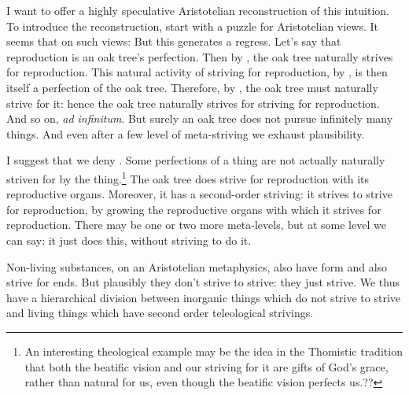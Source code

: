 I want to offer a highly speculative Aristotelian reconstruction of this intuition. To introduce the reconstruction, start with a puzzle for
Aristotelian views. It seems that on such views:
But this generates a regress. Let's say that reproduction is an oak tree's perfection. Then by , the oak tree naturally strives for
reproduction. This natural activity of striving for reproduction, by , is then itself a perfection of the oak tree. Therefore,
by , the oak tree must naturally strive for it: hence the oak tree naturally strives for striving for reproduction. And so on,
\textit{ad infinitum}. But surely an oak tree does not pursue infinitely many things. And even after a few level of meta-striving we exhaust plausibility.

I suggest that we deny . Some perfections of a thing are not actually naturally striven for by the thing.\footnote{An interesting
theological example may be the idea in the Thomistic tradition that both the beatific vision and our striving for it are gifts of God's grace, rather than
natural for us, even though the beatific vision perfects us.??} The oak tree does strive for reproduction with its reproductive organs. Moreover, it has a
second-order striving: it strives to strive for reproduction, by growing the reproductive organs with which it strives for reproduction. There may be one or
two more meta-levels, but at some level we can say: it just does this, without striving to do it.

Non-living substances, on an Aristotelian metaphysics, also have form and also strive for ends. But plausibly they don't strive to strive: they just strive.
We thus have a hierarchical division between inorganic things which do not strive to strive and living things which have second order teleological strivings.

